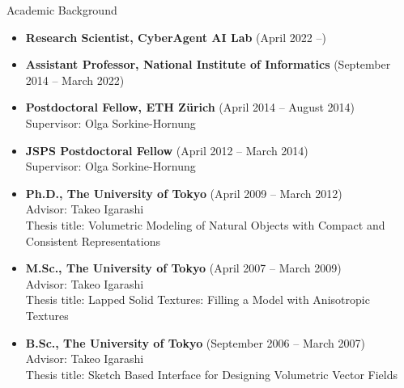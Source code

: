 {\Large\sc Academic Background}
\vspace{-3mm}
\begin{itemize}
\item {\bf Research Scientist, CyberAgent AI Lab} (April 2022 --)

\item {\bf Assistant Professor, National Institute of Informatics} (September 2014 -- March 2022)

\item {\bf Postdoctoral Fellow, ETH Z\"{u}rich} (April 2014 -- August 2014)\\
Supervisor: Olga Sorkine-Hornung

\item {\bf JSPS Postdoctoral Fellow} (April 2012 -- March 2014)\\
Supervisor: Olga Sorkine-Hornung

\item {\bf Ph.D., The University of Tokyo} (April 2009 -- March 2012)\\
Advisor: Takeo Igarashi\\
Thesis title: Volumetric Modeling of Natural Objects with Compact and Consistent Representations

\item {\bf M.Sc., The University of Tokyo} (April 2007 -- March 2009)\\
Advisor: Takeo Igarashi\\
Thesis title: Lapped Solid Textures: Filling a Model with Anisotropic Textures

\item {\bf B.Sc., The University of Tokyo} (September 2006 -- March 2007)\\
Advisor: Takeo Igarashi\\
Thesis title: Sketch Based Interface for Designing Volumetric Vector Fields
\end{itemize}
